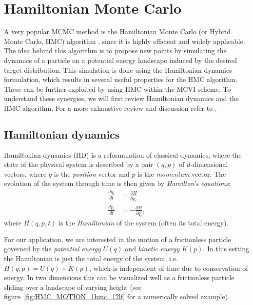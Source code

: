 \section{Hamiltonian Monte Carlo}
\label{sec:HMC}
A very popular MCMC method is the Hamiltonian Monte Carlo (or Hybrid Monte Carlo, HMC) algorithm \parencite{Duane1987}, since it is highly efficient and widely applicable. The idea behind this algorithm is to propose new points by simulating the dynamics of a particle on a potential energy landscape induced by the desired target distribution. This simulation is done using the Hamiltonian dynamics formulation, which results in several useful properties for the HMC algorithm. These can be further exploited by using HMC within the MCVI scheme. To understand these synergies, we will first review Hamiltonian dynamics and the HMC algorithm. For a more exhaustive review and discussion refer to \textcite{Neal2011}.

\subsection{Hamiltonian dynamics}

Hamiltonian dynamics (HD) is a reformulation of classical dynamics, where the state of the physical system is described by a pair $(q, p)$ of $d$-dimensional vectors, where $q$ is the \textit{position} vector and $p$ is the \textit{momentum} vector. The evolution of the system through time is then given by \textit{Hamilton's equations}:
\begin{equation} \label{eq:HamiltonsEquations}
\begin{split}
\frac{dq_i}{dt} &= \frac{\partial H}{\partial p_i} \\
\frac{dp_i}{dt} &= - \frac{\partial H}{\partial q_i},
\end{split}
\end{equation}
where $H(q, p, t)$ is the \textit{Hamiltonian} of the system (often its total energy).

For our application, we are interested in the motion of a frictionless particle governed by the \textit{potential energy} $U(q)$ and \textit{kinetic energy} $K(p)$. In this setting the Hamiltonian is just the total energy of the system, i.e.\ $H(q, p) = U(q) + K(p)$, which is independent of time due to conservation of energy. In two dimensions this can be visualized well as a frictionless particle sliding over a landscape of varying height (see figure~\ref{fig:HMC_MOTION_1hmc_12lf} for a numerically solved example).


